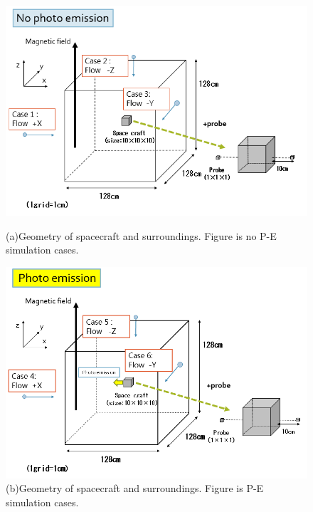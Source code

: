 \begin{figure}
        \includegraphics[width = \textwidth]{images/picture_simulation1.png}
	\caption{(a)Geometry of spacecraft and surroundings. Figure is no P-E simulation cases.}
        \includegraphics[width = \textwidth]{images/picture_simulation2-2.png}
        \caption{(b)Geometry of spacecraft and surroundings. Figure is P-E simulation cases.}
    \end{figure}

